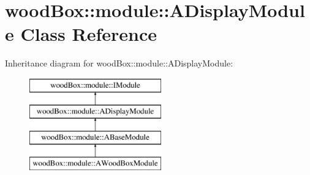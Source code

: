 \hypertarget{classwood_box_1_1module_1_1_a_display_module}{}\section{wood\+Box\+:\+:module\+:\+:A\+Display\+Module Class Reference}
\label{classwood_box_1_1module_1_1_a_display_module}
Inheritance diagram for wood\+Box\+:\+:module\+:\+:A\+Display\+Module\+:\begin{figure}[H]
\begin{center}
\leavevmode
\includegraphics[height=4.000000cm]{classwood_box_1_1module_1_1_a_display_module}
\end{center}
\end{figure}
